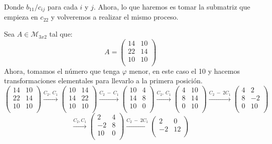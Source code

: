 Donde $b_{11}/ c_{ij}$ para cada $i$ y $j$. Ahora, lo que haremos es tomar la submatriz que empieza en $c_{22}$ y volveremos a realizar el mismo proceso.

\begin{ejemplo}
	Sea $A \in \mathcal{M}_{3x2}$ tal que:
	\[
	A =
	\begin{pmatrix}
 14 & 10 \\
 22 & 14\\
 10 & 10\\
\end{pmatrix}
	\]
	Ahora, tomamos el número que tenga $\varphi$ menor, en este caso el 10 y hacemos transformaciones elementales para llevarlo a la primera posición.
	\[\begin{pmatrix}
 14 & 10 \\
 22 & 14\\
 10 & 10\\
\end{pmatrix} \xrightarrow{C_2,\ C_1}
	\begin{pmatrix}
 10 & 14 \\
 14 & 22\\
 10 & 10\\
\end{pmatrix} \xrightarrow{C_2\ -\ C_1} \begin{pmatrix}
 10 & 4 \\
 14 & 8\\
 10 & 0\\
\end{pmatrix}\xrightarrow{C_2,\ C_1}
\begin{pmatrix}
 4 & 10 \\
 8 & 14\\
 0 & 10\\
\end{pmatrix}\xrightarrow{C_2\ -\ 2C_1}  \begin{pmatrix}
 4 & 2 \\
 8 & -2\\
 0 & 10\\
\end{pmatrix}
	\]
	\[
	\xrightarrow{C_2, C_1}
	\begin{pmatrix}
 2 & 4 \\
 -2 & 8\\
 10 & 0\\
\end{pmatrix} \xrightarrow{C_2\ -\ 2C_1}
\begin{pmatrix}
 2 & 0 \\
 -2 & 12\\

\end{pmatrix}\]
\end{ejemplo}
